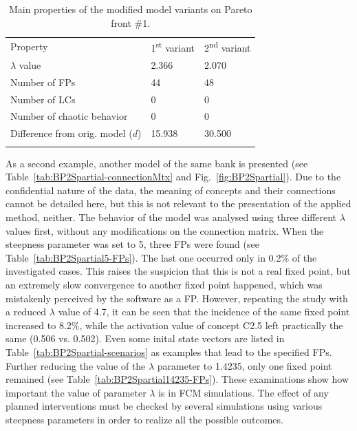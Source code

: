 \documentclass[graybox]{svmult}
\begin{document}
\begin{table}
\caption{Main properties of the modified model variants on Pareto front \#1.}
\label{tab:variantsProps}
\begin{center}
\begin{tabular}{lll}
\hline\noalign{\smallskip}
Property & 1\textsuperscript{st} variant & 2\textsuperscript{nd} variant\\
\noalign{\smallskip}\svhline\noalign{\smallskip}
$\lambda$ value & 2.366 & 2.070 \\
Number of FPs & 44 & 48 \\
Number of LCs & 0 & 0 \\
Number of chaotic behavior & 0 & 0 \\
Difference from orig. model ($d$) & 15.938 & 30.500 \\
\noalign{\smallskip}\hline
\end{tabular}
\end{center}
\end{table}

As a second example, another model of the same bank is presented (see Table~\ref{tab:BP2Spartial-connectionMtx} and Fig.~\ref{fig:BP2Spartial}). Due to the confidential nature of the data, the meaning of concepts and their connections cannot be detailed here, but this is not relevant to the presentation of the applied method, neither. The behavior of the model was analysed using three different $\lambda$ values first, without any modifications on the connection matrix. When the steepness parameter was set to 5, three FPs were found (see Table~\ref{tab:BP2Spartial5-FPs}). The last one occurred only in 0.2\% of the investigated cases. This raises the suspicion that this is not a real fixed point, but an extremely slow convergence to another fixed point happened, which was mistakenly perceived by the software as a FP. However, repeating the study with a reduced $\lambda$ value of 4.7, it can be seen that the incidence of the same fixed point increased to 8.2\%, while the activation value of concept C2.5 left practically the same (0.506 vs. 0.502). Even some inital state vectors are listed in Table~\ref{tab:BP2Spartial-scenarios} as examples that lead to the specified FPs. Further reducing the value of the $\lambda$ parameter to 1.4235, only one fixed point remained (see Table~\ref{tab:BP2Spartial14235-FPs}). These examinations show how important the value of parameter $\lambda$ is in FCM simulations. The effect of any planned interventions must be checked by several simulations using various steepness parameters in order to realize all the possible outcomes.
\end{document}
